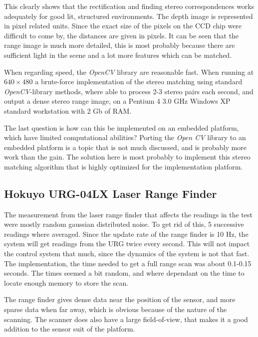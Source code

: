 This clearly shows that the rectification and finding stereo correspondences
works adequately for good lit, structured
environments. The depth image is represented in pixel related units. Since the exact size
of the pixels on the CCD chip were difficult to come by, the distances are given in
pixels. It can be seen that the range image is much more detailed, this is most probably
because there are sufficient light in the scene and a lot more features which can be
matched.

When regarding speed, the \emph{OpenCV} library are reasonable fast. When running at
$640\times480$ a brute-force implementation of the stereo matching using standard
\emph{OpenCV}-library methods, where able to process 2-3 stereo pairs each second, and
output a dense stereo range image, on a Pentium 4 3.0 GHz Windows XP standard workstation
with 2 Gb of RAM. 

The last question is how can this be implemented on an embedded platform, which have limited
computational abilities? Porting the \emph{Open CV} library to an embedded platform is a
topic that is not much discussed, and is probably more work than the gain. The solution
here is most probably to implement this stereo matching algorithm that is highly optimized
for the implementation platform. 




\subsection{Hokuyo URG-04LX Laser Range Finder}
The measurement from the laser range finder that affects the readings in the test were
mostly random gaussian distributed noise. To get rid of this, 5 successive
readings where averaged. Since the update rate of the range finder is 10 Hz, the system
will get readings from the URG twice every second. This will not impact the control system
that much, since the dynamics of the system is not that fast. The implementation, the time
needed to get a full range scan was about 0.1-0.15 seconds. The times seemed a bit random,
and where dependant on the time to locate enough memory to store the scan. 

The range finder gives dense data near the position of the sensor, and more sparse data
when far away, which is obvious because of the nature of the scanning. The scanner does
also have a large field-of-view, that makes it a good addition to the sensor suit of the
platform. 


